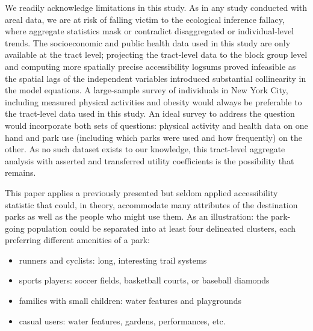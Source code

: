 \documentclass[shortAfour,sageh.bst]{sagej}
\begin{document}
We readily acknowledge limitations in this study. As in any study
conducted with areal data, we are at risk of falling victim to the
ecological inference fallacy, where aggregate statistics mask or
contradict disaggregated or individual-level trends. The socioeconomic
and public health data used in this study are only available at the
tract level; projecting the tract-level data to the block group level
and computing more spatially precise accessibility logsums proved
infeasible as the spatial lags of the independent variables introduced
substantial collinearity in the model equations. A large-sample survey
of individuals in New York City, including measured physical activities
and obesity would always be preferable to the tract-level data used in
this study. An ideal survey to address the question would incorporate
both sets of questions: physical activity and health data on one hand
and park use (including which parks were used and how frequently) on the
other. As no such dataset exists to our knowledge, this tract-level
aggregate analysis with asserted and transferred utility coefficients is
the possibility that remains.

This paper applies a previously presented but seldom applied
accessibility statistic that could, in theory, accommodate many
attributes of the destination parks as well as the people who might use
them. As an illustration: the park-going population could be separated
into at least four delineated clusters, each preferring different
amenities of a park:

\begin{itemize}
 \item{runners and cyclists: long, interesting trail systems}
 \item{sports players: soccer fields, basketball courts, or baseball diamonds}
 \item{families with small children: water features and playgrounds}
 \item{casual users: water features, gardens, performances, etc.}
\end{itemize}
\end{document}
